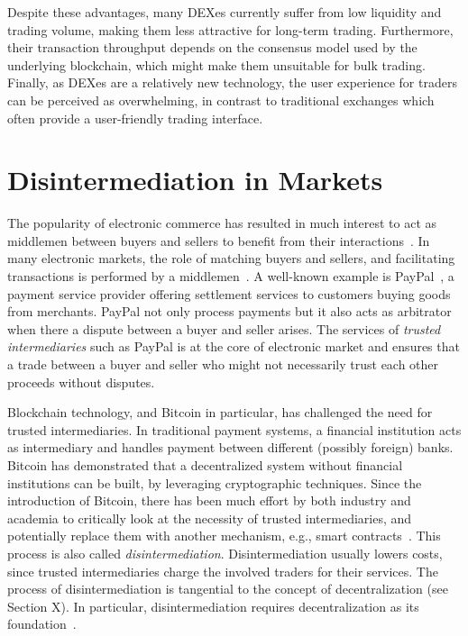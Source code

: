 Despite these advantages, many DEXes currently suffer from low liquidity and trading volume, making them less attractive for long-term trading.
Furthermore, their transaction throughput depends on the consensus model used by the underlying blockchain, which might make them unsuitable for bulk trading.
Finally, as DEXes are a relatively new technology, the user experience for traders can be perceived as overwhelming, in contrast to traditional exchanges which often provide a user-friendly trading interface.

\section{Disintermediation in Markets}
The popularity of electronic commerce has resulted in much interest to act as middlemen between buyers and sellers to benefit from their interactions~\cite{clark1999electronic}.
In many electronic markets, the role of matching buyers and sellers, and facilitating transactions is performed by a middlemen~\cite{bakos1998emerging}.
A well-known example is PayPal~\cite{paypal}, a payment service provider offering settlement services to customers buying goods from merchants.
PayPal not only process payments but it also acts as arbitrator when there a dispute between a buyer and seller arises.
The services of \emph{trusted intermediaries} such as PayPal is at the core of electronic market and ensures that a trade between a buyer and seller who might not necessarily trust each other proceeds without disputes.

Blockchain technology, and Bitcoin in particular, has challenged the need for trusted intermediaries.
In traditional payment systems, a financial institution acts as intermediary and handles payment between different (possibly foreign) banks.
Bitcoin has demonstrated that a decentralized system without financial institutions can be built, by leveraging cryptographic techniques.
Since the introduction of Bitcoin, there has been much effort by both industry and academia to critically look at the necessity of trusted intermediaries, and potentially replace them with another mechanism, e.g., smart contracts~\cite{lande2018sok}.
This process is also called \emph{disintermediation}.
Disintermediation usually lowers costs, since trusted intermediaries charge the involved traders for their services.
The process of disintermediation is tangential to the concept of decentralization (see Section X).
In particular, disintermediation requires decentralization as its foundation~\cite{guo2016blockchain}.

